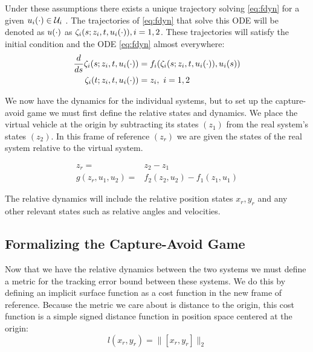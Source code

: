 Under these assumptions there exists a unique trajectory solving \ref{eq:fdyn} for a given $u_i(\cdot) \in \mathcal{U}_i$ \cite{Evans84}. The trajectories of \ref{eq:fdyn} that solve this ODE will be denoted as $u(\cdot)$ as $\zeta_i(s; z_i, t, u_i(\cdot)), i = 1,2$. These trajectories will satisfy the initial condition and the ODE \ref{eq:fdyn} almost everywhere:
\begin{equation}
\label{eq:fdyn_traj}
\begin{aligned}
\frac{d}{ds}\zeta_i(s; z_i, t, u_i(\cdot)) &= f_i(\zeta_i(s; z_i, t, u_i(\cdot)), u_i(s)) \\
\zeta_i(t; z_i, t, u_i(\cdot)) &= z_i, \ i = 1,2
\end{aligned}
\end{equation}

We now have the dynamics for the individual systems, but to set up the capture-avoid game we must first define the relative states and dynamics. We place the virtual vehicle at the origin by subtracting its states $(z_1)$ from the real system's states $(z_2)$. In this frame of reference $(z_r)$ we are given the states of the real system relative to the virtual system.

\begin{equation}
\begin{aligned}
z_r =& z_2 - z_1 \\
g(z_r,u_1,u_2) =& f_2(z_2,u_2) - f_1(z_1,u_1)
\end{aligned}
\end{equation}

The relative dynamics will include the relative position states $x_r, y_r$ and any other relevant states such as relative angles and velocities.

\subsection{Formalizing the Capture-Avoid Game}
Now that we have the relative dynamics between the two systems we must define a metric for the tracking error bound between these systems. We do this by defining an implicit surface function as a cost function in the new frame of reference. Because the metric we care about is distance to the origin, this cost function is a simple signed distance function in position space centered at the origin:
\begin{equation}
l(x_r,y_r)= \| [x_r,y_r] \|_2
\end{equation}

